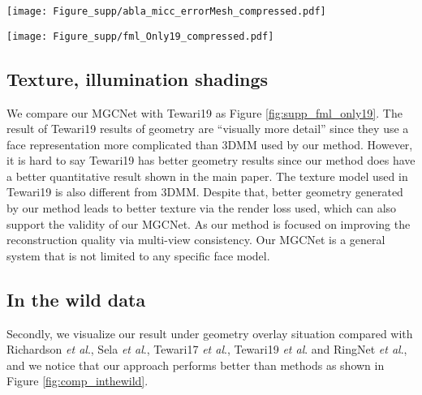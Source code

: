 \documentclass[runningheads]{llncs}
\newcommand{\etal}{\textit{et al}.}
\begin{document}
\begin{figure*}[htb]
	\centering
	\texttt{[image: Figure\_supp/abla\_micc\_errorMesh\_compressed.pdf]}
	\caption{Quantitative evaluation of point-to-plane root mean squared error as the error map format on the  MICC Florence 3D Face dataset \cite{dataset_florence}. The error map range is .
	}
	\label{fig:supp_abl_errMesh}
\end{figure*}

\begin{figure*}[htb]
	\centering
	\texttt{[image: Figure\_supp/fml\_Only19\_compressed.pdf]}
	\caption{Quantitative evaluation compare with Tewari19 \cite{unsuper_mul_tewari2019fml}.
	}
	\label{fig:supp_fml_only19}
\end{figure*}


\subsection{Texture, illumination shadings} \label{compare_fml}
We compare our MGCNet with Tewari19 \cite{unsuper_mul_tewari2019fml} as Figure \ref{fig:supp_fml_only19}.
The result of Tewari19 \cite{unsuper_mul_tewari2019fml} results of geometry are “visually more detail” since they use a face representation more complicated than 3DMM used by our method. However, it is hard to say Tewari19 \cite{unsuper_mul_tewari2019fml} has better geometry results since our method does have a better quantitative result shown in the main paper.
The texture model used in Tewari19 \cite{unsuper_mul_tewari2019fml} is also different from 3DMM. Despite that, better geometry generated by our method leads to better texture via the render loss used, which can also support the validity of our MGCNet. As our method is focused on improving the reconstruction quality via multi-view consistency. Our MGCNet is a general system that is not limited to any specific face model.


\subsection{In the wild data} \label{compare_in_wild}
Secondly, we visualize our result under geometry overlay situation compared with Richardson \etal \cite{unsuper_richardson2017learning}, Sela \etal \cite{super_iter_sela2017unrestricted}, Tewari17 \etal \cite{unsuper_tewari2017mofa}, Tewari19 \etal \cite{unsuper_mul_tewari2019fml} and RingNet \etal \cite{unsuper_mul_sanyal2019learning_ring}, and we notice that our approach performs better than methods \cite{unsuper_richardson2017learning,super_iter_sela2017unrestricted,unsuper_tewari2017mofa,unsuper_mul_tewari2019fml,unsuper_mul_sanyal2019learning_ring} as shown in Figure \ref{fig:comp_inthewild}.
\end{document}
